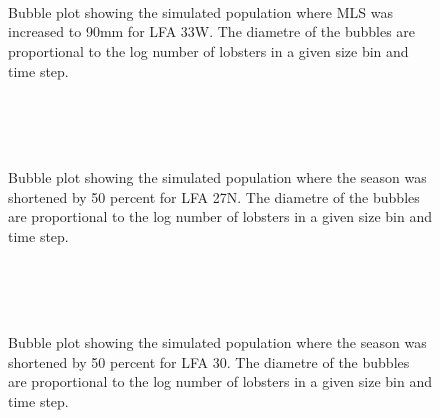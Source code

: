 \documentclass[11pt]{article}
\newcommand{\e}{\string~/bio.data/bio.lobster/figures/LFA2733Framework2018/} %
\begin{document}
    \begin{figure}
    \centering
                \\
                \\
                \\
        
         \caption{Bubble plot showing the simulated population where MLS was increased to 90mm for LFA 33W. The diametre of the bubbles are proportional to the log number of lobsters in a given size bin and time step.}
    \end{figure}
    


    \begin{figure}
    \centering
                \\
                \\
                \\
        
         \caption{Bubble plot showing the simulated population where the season was shortened by 50 percent for LFA 27N. The diametre of the bubbles are proportional to the log number of lobsters in a given size bin and time step.}
    \end{figure}
    
    \begin{figure}
    \centering
                \\
                \\
                \\
        
         \caption{Bubble plot showing the simulated population where the season was shortened by 50 percent  for LFA 30. The diametre of the bubbles are proportional to the log number of lobsters in a given size bin and time step.}
    \end{figure}
    
\end{document}
